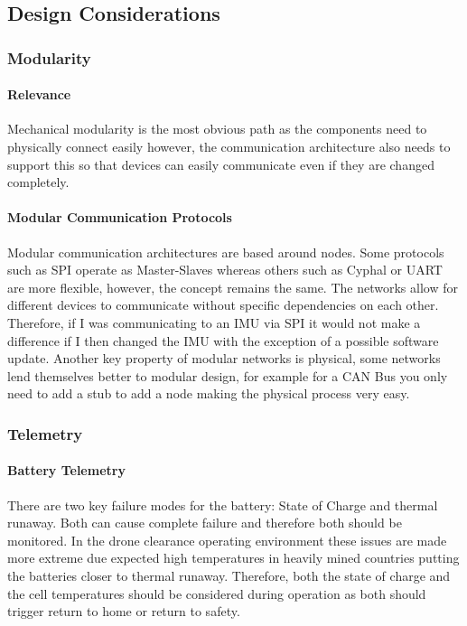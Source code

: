 \subsection{Design Considerations}

\subsubsection{Modularity}
\paragraph{Relevance}
Mechanical modularity is the most obvious path as the components need to physically connect easily however, the communication architecture also needs to support this so that devices can easily communicate even if they are changed completely.
\paragraph{Modular Communication Protocols}
Modular communication architectures are based around nodes. Some protocols such as \gls{SPI} operate as Master-Slaves whereas others such as Cyphal or \gls{UART} are more flexible, however, the concept remains the same. The networks allow for different devices to communicate without specific dependencies on each other. Therefore, if I was communicating to an \gls{IMU} via \gls{SPI} it would not make a difference if I then changed the \gls{IMU} with the exception of a possible software update. Another key property of modular networks is physical, some networks lend themselves better to modular design, for example for a \gls{CAN} Bus you only need to add a stub to add a node making the physical process very easy.


\subsubsection{Telemetry}
\paragraph{Battery Telemetry}
There are two key failure modes for the battery: State of Charge and thermal runaway. Both can cause complete failure and therefore both should be monitored. In the drone clearance operating environment these issues are made more extreme due expected high temperatures in heavily mined countries putting the batteries closer to thermal runaway. Therefore, both the state of charge and the cell temperatures should be considered during operation as both should trigger return to home or return to safety. 
